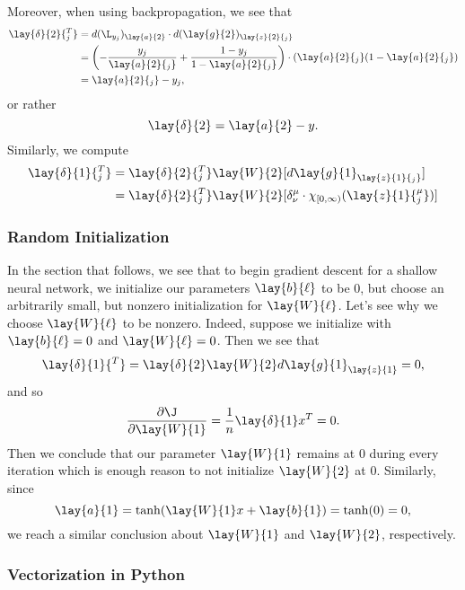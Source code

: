 Moreover, when using backpropagation, we see that
\begin{align*}
	\lay{\delta}{2}{^T_j}&=d(\L_{y_j})_{\lay{a}{2}}\cdot d(\lay{g}{2})_{\lay{z}{2}{_j}}\\
	&=\left(-\frac{y_j}{\lay{a}{2}{_j}}+\frac{1-y_j}{1-\lay{a}{2}{_j}}\right)\cdot(\lay{a}{2}{_j}(1-\lay{a}{2}{_j})\\
	&=\lay{a}{2}{_j}-y_j,
\end{align*}
or rather
$$\lay{\delta}{2}=\lay{a}{2}-y.$$
Similarly, we compute
\begin{align*}
	\lay{\delta}{1}{_j^T}&=\lay{\delta}{2}{_j^T}\lay{W}{2}[d\lay{g}{1}_{\lay{z}{1}{_j}}]\\
	&=\lay{\delta}{2}{_j^T}\lay{W}{2}[\delta^\mu_\nu\cdot\chi_{[0,\infty)}(\lay{z}{1}{^\mu_j})]
\end{align*}


\subsubsection{Random Initialization}
In the section that follows, we see that to begin gradient descent for a shallow neural network, we initialize our parameters $\lay{b}{\ell}$ to be $0$, but choose an arbitrarily small, but nonzero initialization for $\lay{W}{\ell}$.  Let's see why we choose $\lay{W}{\ell}$ to be nonzero.  Indeed, suppose we initialize with $\lay{b}{\ell}=0$ and $\lay{W}{\ell}=0$.  Then we see that
$$\lay{\delta}{1}{^T}=\lay{\delta}{2}\lay{W}{2}d\lay{g}{1}_{\lay{z}{1}}=0,$$
and so
$$\frac{\partial\J}{\partial\lay{W}{1}}=\frac{1}{n}\lay{\delta}{1}x^T=0.$$
Then we conclude that our parameter $\lay{W}{1}$ remains at $0$ during every iteration which is enough reason to not initialize $\lay{W}{2}$ at $0$.  Similarly, since
$$\lay{a}{1}=\tanh(\lay{W}{1}x+\lay{b}{1})=\tanh(0)=0,$$
we reach a similar conclusion about $\lay{W}{1}$ and $\lay{W}{2}$, respectively.

\subsubsection{Vectorization in Python}


